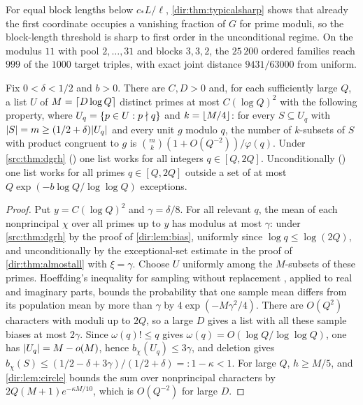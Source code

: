 For equal block lengths below $c_*L/\ell$, \cref{dir:thm:typicalsharp} shows that already the first
coordinate occupies a vanishing fraction of $G$ for prime moduli, so the block-length threshold is sharp
to first order in the unconditional regime. On the modulus $11$ with pool $2,\dots,31$ and blocks
$3,3,2$, the $25\,200$ ordered families reach $999$ of the $1000$ target triples, with exact joint
distance $9431/63000$ from uniform.

\begin{corollary}\label{dir:cor:list}
Fix $0<\delta<1/2$ and $b>0$. There are $C,D>0$ and, for each sufficiently large $Q$, a list
$U$ of $M=\lceil D\log Q\rceil$ distinct primes at most $C(\log Q)^2$ with the following property,
where $U_q=\{p\in U:p\nmid q\}$ and $k=\lfloor M/4\rfloor$: for every $S\subseteq U_q$ with
$\lvert S\rvert=m\ge(1/2+\delta)\lvert U_q\rvert$ and every unit $g$ modulo $q$, the number of $k$-subsets of
$S$ with product congruent to $g$ is $\binom mk(1+O(Q^{-2}))/\varphi(q)$. Under
\cref{src:thm:dgrh} \textup{(\stG)} one list works for all integers $q\in[Q,2Q]$.
Unconditionally \textup{(\stU)} one list works for all primes $q\in[Q,2Q]$ outside a set of at
most $Q\exp(-b\log Q/\log\log Q)$ exceptions.
\end{corollary}

\begin{proof}
Put $y=C(\log Q)^2$ and $\gamma=\delta/8$. For all relevant $q$, the mean of each nonprincipal
$\chi$ over all primes up to $y$ has modulus at most $\gamma$: under \cref{src:thm:dgrh} by the
proof of \cref{dir:lem:bias}, uniformly since $\log q\le\log(2Q)$, and unconditionally by the
exceptional-set estimate in the proof of \cref{dir:thm:almostall} with $\xi=\gamma$. Choose $U$
uniformly among the $M$-subsets of these primes. Hoeffding's inequality for sampling without
replacement \cite[\S6]{Hoeffding1963Probability}, applied to real and imaginary parts, bounds the
probability that one sample mean differs from its population mean by more than $\gamma$ by
$4\exp(-M\gamma^2/4)$. There are $O(Q^2)$ characters with moduli up to $2Q$, so a large $D$
gives a list with all these sample biases at most $2\gamma$. Since $\omega(q)!\le q$ gives
$\omega(q)=O(\log Q/\log\log Q)$, one has $\lvert U_q\rvert=M-o(M)$, hence $b_\chi(U_q)\le3\gamma$, and
deletion gives $b_\chi(S)\le(1/2-\delta+3\gamma)/(1/2+\delta)=:1-\kappa<1$. For large $Q$,
$h\ge M/5$, and \cref{dir:lem:circle} bounds the sum over nonprincipal characters by
$2Q(M+1)e^{-\kappa M/10}$, which is $O(Q^{-2})$ for large $D$.
\end{proof}

